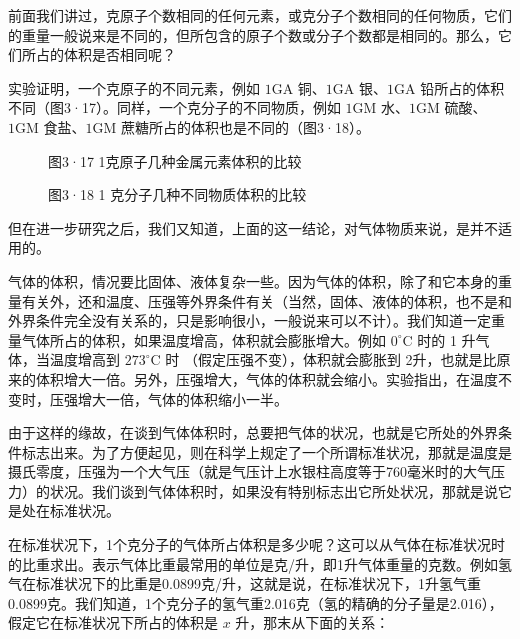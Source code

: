 前面我们讲过，克原子个数相同的任何元素，或克分子个数相同的任何物质，它们的重量一般说来是不同的，但所包含的原子个数或分子个数都是相同的。那么，它们所占的体积是否相同呢？

实验证明，一个克原子的不同元素，例如 \(1 \mathrm{GA}\)
铜、\(1 \mathrm{GA}\) 银、\(1 \mathrm{GA}\) 铅所占的体积不同（图3·17）。同样，一个克分子的不同物质，例如 \(1 \mathrm{GM}\)
水、\(1 \mathrm{GM}\) 硫酸、\(1 \mathrm{GM}\) 食盐、\(1 \mathrm{GM}\)
蔗糖所占的体积也是不同的（图3·18）。

\begin{figure}
\centering
\caption{图3·17 1克原子几种金属元素体积的比较}
\end{figure}

\begin{figure}
\centering
\caption{图3·18 1 克分子几种不同物质体积的比较}
\end{figure}

但在进一步研究之后，我们又知道，上面的这一结论，对气体物质来说，是并不适用的。

气体的体积，情况要比固体、液体复杂一些。因为气体的体积，除了和它本身的重量有关外，还和温度、压强等外界条件有关（当然，固体、液体的体积，也不是和外界条件完全没有关系的，只是影响很小，一般说来可以不计）。我们知道一定重量气体所占的体积，如果温度增高，体积就会膨胀增大。例如
\(0^{\circ} \mathrm{C}\) 时的 1 升气体，当温度增高到
\(273^{\circ} \mathrm{C}\) 时 （假定压强不变），体积就会膨胀到
2升，也就是比原来的体积增大一倍。另外，压强增大，气体的体积就会缩小。实验指出，在温度不变时，压强增大一倍，气体的体积缩小一半。

由于这样的缘故，在谈到气体体积时，总要把气体的状况，也就是它所处的外界条件标志出来。为了方便起见，则在科学上规定了一个所谓标准状况，那就是温度是摄氏零度，压强为一个大气压（就是气压计上水银柱高度等于760毫米时的大气压力）的状况。我们谈到气体体积时，如果没有特别标志出它所处状况，那就是说它是处在标准状况。

在标准状况下，1个克分子的气体所占体积是多少呢？这可以从气体在标准状况时的比重求出。表示气体比重最常用的单位是克/升，即1升气体重量的克数。例如氢气在标准状况下的比重是0.0899克/升，这就是说，在标准状况下，1升氢气重0.0899克。我们知道，1个克分子的氢气重2.016克（氢的精确的分子量是2.016），假定它在标准状况下所占的体积是
\(x\) 升，那末从下面的关系：

